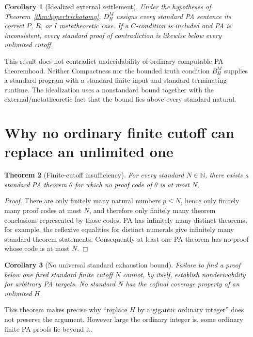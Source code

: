 \documentclass[11pt,openany]{book}
\newtheorem{theorem}{Theorem}[chapter]
\newtheorem{corollary}[theorem]{Corollary}
\theoremstyle{definition}
\theoremstyle{remark}
\newcommand{\N}{\mathbb{N}}
\begin{document}
\begin{corollary}[Idealized external settlement]\label{cor:hyperdecider}
Under the hypotheses of Theorem~\ref{thm:hypertrichotomy}, \(D_H^M\) assigns every standard PA sentence its correct \(P\), \(R\), or \(I\) metatheoretic case. If a \(C\)-condition is included and PA is inconsistent, every standard proof of contradiction is likewise below every unlimited cutoff.
\end{corollary}

This result does not contradict undecidability of ordinary computable PA theoremhood. Neither Compactness nor the bounded truth condition \(B_H^M\) supplies a standard program with a standard finite input and standard terminating runtime. The idealization uses a nonstandard bound together with the external/metatheoretic fact that the bound lies above every standard natural.

\section{Why no ordinary finite cutoff can replace an unlimited one}
\begin{theorem}[Finite-cutoff insufficiency]\label{thm:finitecutoff}
For every standard \(N\in\N\), there exists a standard PA theorem \(\theta\) for which no proof code of \(\theta\) is at most \(N\).
\end{theorem}
\begin{proof}
There are only finitely many natural numbers \(p\le N\), hence only finitely many proof codes at most \(N\), and therefore only finitely many theorem conclusions represented by those codes. PA has infinitely many distinct theorems; for example, the reflexive equalities for distinct numerals give infinitely many standard theorem statements. Consequently at least one PA theorem has no proof whose code is at most \(N\).
\end{proof}

\begin{corollary}[No universal standard exhaustion bound]\label{cor:nostandardcutoff}
Failure to find a proof below one fixed standard finite cutoff \(N\) cannot, by itself, establish nonderivability for arbitrary PA targets. No standard \(N\) has the cofinal coverage property of an unlimited \(H\).
\end{corollary}

This theorem makes precise why ``replace \(H\) by a gigantic ordinary integer'' does not preserve the argument. However large the ordinary integer is, some ordinary finite PA proofs lie beyond it.
\end{document}
